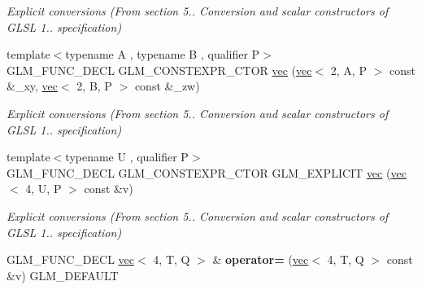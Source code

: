 \begin{DoxyCompactItemize}
\begin{DoxyCompactList}\small\item\em Explicit conversions (From section 5.. Conversion and scalar constructors of G\+L\+SL 1.. specification) \end{DoxyCompactList}\item 
\mbox{\label{structglm_1_1vec_3_014_00_01T_00_01Q_01_4_af18e05d8f9e28ed3dab7cd8b2150fede}} 
{\footnotesize template$<$typename A , typename B , qualifier P$>$ }\\G\+L\+M\+\_\+\+F\+U\+N\+C\+\_\+\+D\+E\+CL G\+L\+M\+\_\+\+C\+O\+N\+S\+T\+E\+X\+P\+R\+\_\+\+C\+T\+OR \hyperlink{structglm_1_1vec_3_014_00_01T_00_01Q_01_4_af18e05d8f9e28ed3dab7cd8b2150fede}{vec} (\hyperlink{structglm_1_1vec}{vec}$<$ 2, A, P $>$ const \&\+\_\+xy, \hyperlink{structglm_1_1vec}{vec}$<$ 2, B, P $>$ const \&\+\_\+zw)
\begin{DoxyCompactList}\small\item\em Explicit conversions (From section 5.. Conversion and scalar constructors of G\+L\+SL 1.. specification) \end{DoxyCompactList}\item 
\mbox{\label{structglm_1_1vec_3_014_00_01T_00_01Q_01_4_ad1532b19e40e767e98e2ca54aef6a6f4}} 
{\footnotesize template$<$typename U , qualifier P$>$ }\\G\+L\+M\+\_\+\+F\+U\+N\+C\+\_\+\+D\+E\+CL G\+L\+M\+\_\+\+C\+O\+N\+S\+T\+E\+X\+P\+R\+\_\+\+C\+T\+OR G\+L\+M\+\_\+\+E\+X\+P\+L\+I\+C\+IT \hyperlink{structglm_1_1vec_3_014_00_01T_00_01Q_01_4_ad1532b19e40e767e98e2ca54aef6a6f4}{vec} (\hyperlink{structglm_1_1vec}{vec}$<$ 4, U, P $>$ const \&v)
\begin{DoxyCompactList}\small\item\em Explicit conversions (From section 5.. Conversion and scalar constructors of G\+L\+SL 1.. specification) \end{DoxyCompactList}\item 
\mbox{\label{structglm_1_1vec_3_014_00_01T_00_01Q_01_4_ab43daf473170b178dbbf250549eae740}} 
G\+L\+M\+\_\+\+F\+U\+N\+C\+\_\+\+D\+E\+CL \hyperlink{structglm_1_1vec}{vec}$<$ 4, T, Q $>$ \& {\bfseries operator=} (\hyperlink{structglm_1_1vec}{vec}$<$ 4, T, Q $>$ const \&v) G\+L\+M\+\_\+\+D\+E\+F\+A\+U\+LT

\end{DoxyCompactItemize}

